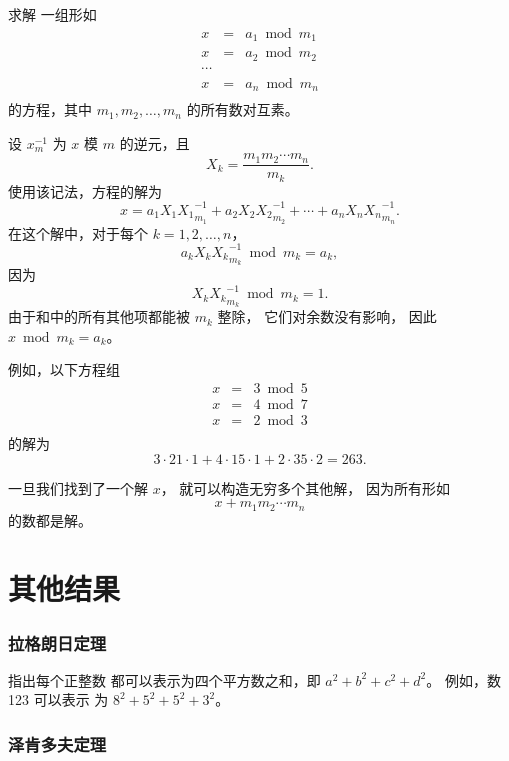 
求解
一组形如
\[
\begin{array}{lcl}
x & = & a_1 \bmod m_1 \\
x & = & a_2 \bmod m_2 \\
\cdots \\
x & = & a_n \bmod m_n \\
\end{array}
\]
的方程，其中 $m_1,m_2,\ldots,m_n$ 的所有数对互素。

设 $x^{-1}_m$ 为 $x$ 模 $m$ 的逆元，且
\[ X_k = \frac{m_1 m_2 \cdots m_n}{m_k}.\]
使用该记法，方程的解为
\[x = a_1 X_1 {X_1}^{-1}_{m_1} + a_2 X_2 {X_2}^{-1}_{m_2} + \cdots + a_n X_n {X_n}^{-1}_{m_n}.\]
在这个解中，对于每个 $k=1,2,\ldots,n$，
\[a_k X_k {X_k}^{-1}_{m_k} \bmod m_k = a_k,\]
因为
\[X_k {X_k}^{-1}_{m_k} \bmod m_k = 1.\]
由于和中的所有其他项都能被 $m_k$ 整除，
它们对余数没有影响，
因此 $x \bmod m_k = a_k$。

例如，以下方程组
\[
\begin{array}{lcl}
x & = & 3 \bmod 5 \\
x & = & 4 \bmod 7 \\
x & = & 2 \bmod 3 \\
\end{array}
\]
的解为
\[ 3 \cdot 21 \cdot 1 + 4 \cdot 15 \cdot 1 + 2 \cdot 35 \cdot 2 = 263.\]

一旦我们找到了一个解 $x$，
就可以构造无穷多个其他解，
因为所有形如
\[x+m_1 m_2 \cdots m_n\]
的数都是解。

\section{其他结果}

\subsubsection{拉格朗日定理}


指出每个正整数
都可以表示为四个平方数之和，即
$a^2+b^2+c^2+d^2$。
例如，数 123 可以表示
为 $8^2+5^2+5^2+3^2$。

\subsubsection{泽肯多夫定理}


